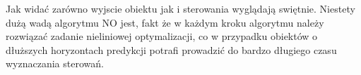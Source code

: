 		Jak widać zarówno wyjscie obiektu jak i sterowania wyglądają swiętnie. Niestety dużą wadą algorytmu NO jest, fakt że w każdym kroku algorytmu należy rozwiązać zadanie nieliniowej optymalizacji, co w przypadku obiektów o dłuższych horyzontach predykcji potrafi prowadzić do bardzo długiego czasu wyznaczania sterowań.